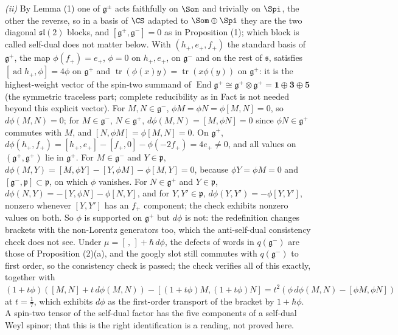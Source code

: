 \emph{(ii)} By Lemma (1) one of $\mathfrak{g}^{\pm}$ acts faithfully on $\Som$ and trivially on $\Spi$, the other the reverse, so in a basis of $\CS$ adapted to $\Som \oplus \Spi$ they are the two diagonal $\mathfrak{sl}(2)$ blocks, and $[\mathfrak{g}^{+}, \mathfrak{g}^{-}] = 0$ as in Proposition (1); which block is called self-dual does not matter below. With $(h_{+}, e_{+}, f_{+})$ the standard basis of $\mathfrak{g}^{+}$, the map $\phi(f_{+}) = e_{+}$, $\phi = 0$ on $h_{+}, e_{+}$, on $\mathfrak{g}^{-}$ and on the rest of $\mathfrak{s}$, satisfies $[\operatorname{ad}h_{+}, \phi] = 4\phi$ on $\mathfrak{g}^{+}$ and $\operatorname{tr}(\phi(x)y) = \operatorname{tr}(x\phi(y))$ on $\mathfrak{g}^{+}$: it is the highest-weight vector of the spin-two summand of $\operatorname{End}\mathfrak{g}^{+} \cong \mathfrak{g}^{+}\otimes\mathfrak{g}^{+} = \mathbf{1}\oplus\mathbf{3}\oplus\mathbf{5}$ (the symmetric traceless part; complete reducibility as in Fact  is not needed beyond this explicit vector). For $M, N \in \mathfrak{g}^{-}$, $\phi M = \phi N = \phi[M,N] = 0$, so $d\phi(M,N) = 0$; for $M \in \mathfrak{g}^{-}$, $N \in \mathfrak{g}^{+}$, $d\phi(M,N) = [M, \phi N] = 0$ since $\phi N \in \mathfrak{g}^{+}$ commutes with $M$, and $[N, \phi M] = \phi[M,N] = 0$. On $\mathfrak{g}^{+}$, $d\phi(h_{+}, f_{+}) = [h_{+}, e_{+}] - [f_{+}, 0] - \phi(-2f_{+}) = 4e_{+} \neq 0$, and all values on $(\mathfrak{g}^{+}, \mathfrak{g}^{+})$ lie in $\mathfrak{g}^{+}$. For $M \in \mathfrak{g}^{-}$ and $Y \in \mathfrak{p}$, $d\phi(M, Y) = [M, \phi Y] - [Y, \phi M] - \phi[M, Y] = 0$, because $\phi Y = \phi M = 0$ and $[\mathfrak{g}^{-}, \mathfrak{p}] \subset \mathfrak{p}$, on which $\phi$ vanishes. For $N \in \mathfrak{g}^{+}$ and $Y \in \mathfrak{p}$, $d\phi(N, Y) = -[Y, \phi N] - \phi[N, Y]$, and for $Y, Y' \in \mathfrak{p}$, $d\phi(Y, Y') = -\phi[Y, Y']$, nonzero whenever $[Y, Y']$ has an $f_{+}$ component; the check exhibits nonzero values on both. So $\phi$ is supported on $\mathfrak{g}^{+}$ but $d\phi$ is not: the redefinition changes brackets with the non-Lorentz generators too, which the anti-self-dual consistency check does not see. Under $\mu = [\,,\,] + \hbar\,d\phi$, the defects of words in $q(\mathfrak{g}^{-})$ are those of Proposition (2)(a), and the googly slot still commutes with $q(\mathfrak{g}^{-})$ to first order, so the consistency check is passed; the check verifies all of this exactly, together with $(1 + t\phi)([M,N] + t\,d\phi(M,N)) - [(1 + t\phi)M, (1 + t\phi)N] = t^{2}(\phi\,d\phi(M,N) - [\phi M, \phi N])$ at $t = \tfrac17$, which exhibits $d\phi$ as the first-order transport of the bracket by $1 + \hbar\phi$. A spin-two tensor of the self-dual factor has the five components of a self-dual Weyl spinor; that this is the right identification is a reading, not proved here.

